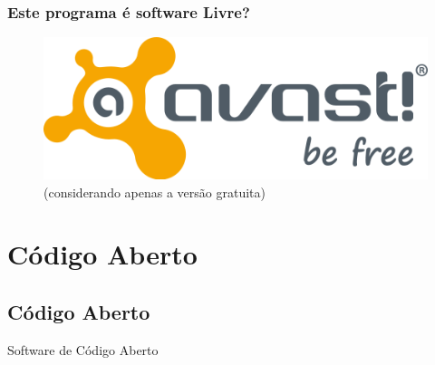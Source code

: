 \documentclass[xcolor=dvipsnames]{beamer}
\begin{document}
\begin{frame}
	\frametitle{Este programa é software Livre?}
	\begin{figure}
	\includegraphics[scale=0.45]{avast.png}\\[0.2cm]
	(considerando apenas a versão gratuita)
	\end{figure}	
\end{frame}


\section{Código Aberto}	
\subsection{Código Aberto}	

\begin{frame}
\vspace{0.2cm}
\begin{center}
\Huge{Software de Código Aberto}
\end{center}
\end{frame}
\end{document}
